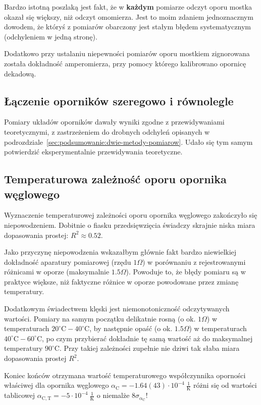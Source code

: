 \documentclass[twocolumn, a4paper, polish, 10pt]{article}
\begin{document}
Bardzo istotną poszlaką jest fakt, że w \textbf{każdym} pomiarze odczyt oporu  mostka okazał się większy, niż odczyt omomierza. Jest to moim zdaniem jednoznacznym dowodem, że któryś z pomiarów obarczony jest stałym błędem systematycznym (odchyleniem w jedną stronę).

Dodatkowo przy ustalaniu niepewności pomiarów oporu mostkiem zignorowana została dokładność amperomierza, przy pomocy którego kalibrowano opornicę dekadową.

\subsection{Łączenie oporników szeregowo i równolegle}
Pomiary układów oporników dawały wyniki zgodne z przewidywaniami teoretycznymi, z zastrzeżeniem do drobnych odchyleń opisanych w podrozdziale~\ref{sec:podsumowanie:dwie-metody-pomiarow}. Udało się tym samym potwierdzić eksperymentalnie przewidywania teoretyczne.

\subsection{Temperaturowa zależność oporu opornika węglowego}
Wyznaczenie temperaturowej zależności oporu opornika węglowego zakończyło się niepowodzeniem. Dobitnie o fiasku przedsięwzięcia świadczy skrajnie niska miara dopasowania prostej: $R^2 \approx 0.52$.

Jako przyczynę niepowodzenia wskazałbym głównie fakt bardzo niewielkiej dokładność aparatury pomiarowej (rzędu $1\Omega$) w porównaniu z rejestrowanymi różnicami w oporze (maksymalnie $1.5\Omega$). Powoduje to, że błędy pomiaru są w praktyce większe, niż faktyczne różnice w oporze powodowane przez zmianę temperatury.

Dodatkowym świadectwem klęski jest niemonotoniczność odczytywanych wartości. Pomiary na samym początku delikatnie rosną (o ok. $1\Omega$) w temperaturach $20^{\circ}\mathrm{C}-40^{\circ}\mathrm{C}$, by następnie opaść (o ok. $1.5\Omega$) w temperaturach $40^{\circ}\mathrm{C}-60^{\circ}\mathrm{C}$, po czym przybierać dokładnie tę samą wartość aż do maksymalnej temperatury $90^{\circ}\mathrm{C}$. Przy takiej zależności zupełnie nie dziwi tak słaba miara dopasowania prostej $R^2$.

Koniec końców otrzymana wartość temperaturowego współczynnika oporności właściwej dla opornika węglowego $\alpha_{\mathrm{C}} = -1.64(43) \cdot 10^{-4}~\frac{1}{ \mathrm{K} }$ różni się od wartości tablicowej $\alpha_{\mathrm{C, T}} = -5 \cdot 10^{-4}~\frac{1}{ \mathrm{K} }$ \cite{pracownia-fizyczna-e3} o niemalże $8 \sigma_{ \alpha_{\mathrm{C}} }$!
\end{document}
